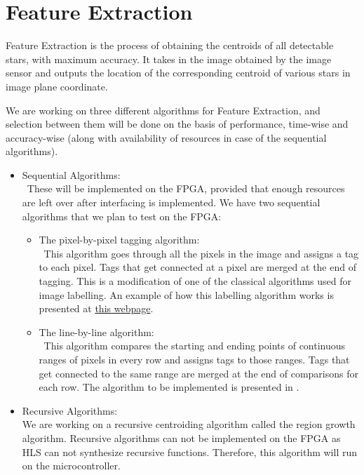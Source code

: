 \section{Feature Extraction}
\thispagestyle{fancy}

Feature Extraction is the process of obtaining the centroids of all detectable stars, with maximum accuracy. It takes in the image obtained by the image sensor and outputs the location of the corresponding centroid of various stars in image plane coordinate.

We are working on three different algorithms for Feature Extraction, and selection between them will be done on the basis of performance, time-wise and accuracy-wise (along with availability of resources in case of the sequential algorithms).
\begin{itemize}
    \item Sequential Algorithms:\\
    \ These will be implemented on the FPGA, provided that enough resources are left over after interfacing is implemented. We have two sequential algorithms that we plan to test on the FPGA:
    \begin{itemize}
        \item The pixel-by-pixel tagging algorithm:\\
        \ This algorithm goes through all the pixels in the image and assigns a tag to each pixel. Tags that get connected at a pixel are merged at the end of tagging. This is a modification of one of the classical algorithms used for image labelling. An example of how this labelling algorithm works is presented at \href{https://aishack.in/tutorials/labelling-connected-components-example/}{this webpage}.
        \item The line-by-line algorithm:\\
        \ This algorithm compares the starting and ending points of continuous ranges of pixels in every row and assigns tags to those ranges. Tags that get connected to the same range are merged at the end of comparisons for each row. The algorithm to be implemented is presented in \cite{fe_blob_detection}.
    \end{itemize}
    \item Recursive Algorithms:\\
    We are working on a recursive centroiding algorithm called the region growth algorithm. Recursive algorithms can not be implemented on the FPGA as HLS can not synthesize recursive functions. Therefore, this algorithm will run on the microcontroller.
\end{itemize}

